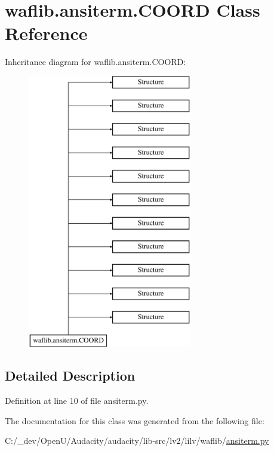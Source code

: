 \hypertarget{classwaflib_1_1ansiterm_1_1_c_o_o_r_d}{}\section{waflib.\+ansiterm.\+C\+O\+O\+RD Class Reference}
\label{classwaflib_1_1ansiterm_1_1_c_o_o_r_d}
Inheritance diagram for waflib.\+ansiterm.\+C\+O\+O\+RD\+:\begin{figure}[H]
\begin{center}
\leavevmode
\includegraphics[height=12.000000cm]{classwaflib_1_1ansiterm_1_1_c_o_o_r_d}
\end{center}
\end{figure}


\subsection{Detailed Description}


Definition at line 10 of file ansiterm.\+py.



The documentation for this class was generated from the following file\+:\begin{DoxyCompactItemize}
\item 
C\+:/\+\_\+dev/\+Open\+U/\+Audacity/audacity/lib-\/src/lv2/lilv/waflib/\hyperlink{lilv_2waflib_2ansiterm_8py}{ansiterm.\+py}\end{DoxyCompactItemize}
